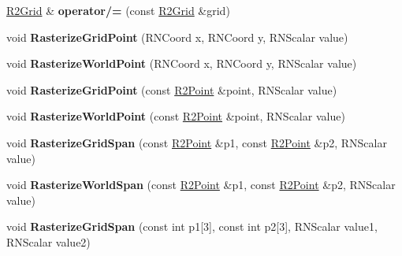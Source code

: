 \begin{DoxyCompactItemize}
\item 
\hyperlink{class_r2_grid}{R2\+Grid} \& {\bfseries operator/=} (const \hyperlink{class_r2_grid}{R2\+Grid} \&grid)\hypertarget{class_r2_grid_ad2b98153f5037e5d772a8a77c273c084}{}\label{class_r2_grid_ad2b98153f5037e5d772a8a77c273c084}

\item 
void {\bfseries Rasterize\+Grid\+Point} (R\+N\+Coord x, R\+N\+Coord y, R\+N\+Scalar value)\hypertarget{class_r2_grid_adc49ffcdfef261b27bc3bfbb655a033f}{}\label{class_r2_grid_adc49ffcdfef261b27bc3bfbb655a033f}

\item 
void {\bfseries Rasterize\+World\+Point} (R\+N\+Coord x, R\+N\+Coord y, R\+N\+Scalar value)\hypertarget{class_r2_grid_a9ed686100f41ed03693f991896cdc966}{}\label{class_r2_grid_a9ed686100f41ed03693f991896cdc966}

\item 
void {\bfseries Rasterize\+Grid\+Point} (const \hyperlink{class_r2_point}{R2\+Point} \&point, R\+N\+Scalar value)\hypertarget{class_r2_grid_af8d1d0070f23bc8406dc4779ed76ee03}{}\label{class_r2_grid_af8d1d0070f23bc8406dc4779ed76ee03}

\item 
void {\bfseries Rasterize\+World\+Point} (const \hyperlink{class_r2_point}{R2\+Point} \&point, R\+N\+Scalar value)\hypertarget{class_r2_grid_aa29e3cf55e60836162b3c4ed2f06fea1}{}\label{class_r2_grid_aa29e3cf55e60836162b3c4ed2f06fea1}

\item 
void {\bfseries Rasterize\+Grid\+Span} (const \hyperlink{class_r2_point}{R2\+Point} \&p1, const \hyperlink{class_r2_point}{R2\+Point} \&p2, R\+N\+Scalar value)\hypertarget{class_r2_grid_a9367fdb40411ed5d720a9dc6f9e56a94}{}\label{class_r2_grid_a9367fdb40411ed5d720a9dc6f9e56a94}

\item 
void {\bfseries Rasterize\+World\+Span} (const \hyperlink{class_r2_point}{R2\+Point} \&p1, const \hyperlink{class_r2_point}{R2\+Point} \&p2, R\+N\+Scalar value)\hypertarget{class_r2_grid_a6c4aa0a2f2b613c23bee6a9bb897df50}{}\label{class_r2_grid_a6c4aa0a2f2b613c23bee6a9bb897df50}

\item 
void {\bfseries Rasterize\+Grid\+Span} (const int p1\mbox{[}3\mbox{]}, const int p2\mbox{[}3\mbox{]}, R\+N\+Scalar value1, R\+N\+Scalar value2)\hypertarget{class_r2_grid_a474840b2af0023b4c26d9e1647c1c831}{}\label{class_r2_grid_a474840b2af0023b4c26d9e1647c1c831}


\end{DoxyCompactItemize}
